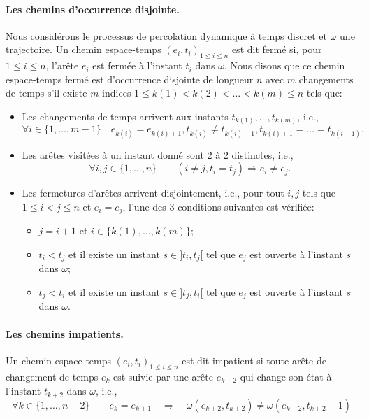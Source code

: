 \documentclass[titlepage,a4paper,12pt]{article}
\newcounter{d}
\newcounter{t}
\newcounter{p}
\newcounter{c}
\newcounter{a}
\newcounter{l}
\begin{document}
\paragraph{Les chemins d'occurrence disjointe.}Nous considérons le processus de percolation dynamique à temps discret et $\omega$ une trajectoire. Un chemin espace-temps $(e_i,t_i)_{1\leqslant i \leqslant n}$ est dit fermé si, pour $1\leqslant i\leqslant n$, l'arête $e_i$ est fermée à l'instant $t_i$ dans $\omega$. Nous disons que ce chemin espace-temps fermé est d'occurrence disjointe de longueur $n$ avec $m$ changements de temps s'il existe $m$ indices $1\leqslant k(1)< k(2) < \dots < k(m) \leqslant n$ tels que:
\begin{itemize}[label = $\bullet$, leftmargin = *]
\item Les changements de temps arrivent aux instants $t_{k(1)},\dots, t_{k(m)}$, i.e.,
$$\forall i\in \{1,\dots, m-1\} \quad e_{k(i)} = e_{k(i)+1},t_{k(i)} \neq t_{k(i)+1}, t_{k(i)+1} =\dots = t_{k(i+1)}.
$$
\item Les arêtes visitées à un instant donné sont 2 à 2 distinctes, i.e.,
$$ \forall i,j \in \{1,\dots, n\} \qquad (i\neq j, t_i = t_j) \Rightarrow e_i\neq e_j.
$$
\item Les fermetures d'arêtes arrivent disjointement, i.e., pour tout $i,j$ tels que $1\leqslant i<j \leqslant n$ et $e_i = e_j$, l'une des 3 conditions suivantes est vérifiée:
\begin{itemize}[label=$\diamond$]
\item $j=i+1$ et $i\in \{k(1),\dots, k(m)\}$;
\item $t_i< t_j$ et il existe un instant $s\in ]t_i,t_j[$ tel que $e_j$ est ouverte à l'instant $s$ dans $\omega$;
\item $t_j< t_i$ et il existe un instant $s\in ]t_j,t_i[$ tel que $e_j$ est ouverte à l'instant $s$ dans $\omega$.
\end{itemize}
\end{itemize}
\paragraph{Les chemins impatients.}
Un chemin espace-temps $(e_i,t_i)_{1\leqslant i \leqslant n}$ est dit impatient si toute arête de changement de temps $e_k$ est suivie par une arête $e_{k+2}$ qui change son état à l'instant $t_{k+2}$ dans $\omega$, i.e.,
$$ \forall k \in \{1,\dots,n-2\} \qquad e_k = e_{k+1} \quad\Rightarrow\quad \omega(e_{k+2},t_{k+2}) \neq \omega(e_{k+2},t_{k+2}-1)
$$
\end{document}
